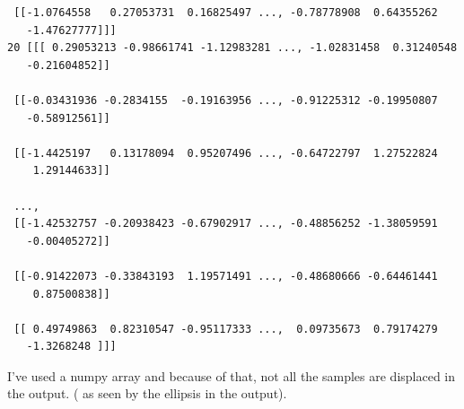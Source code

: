 \documentclass[10pt]{article}
\begin{document}
\begin{flushleft}
\begin{lstlisting}
 [[-1.0764558   0.27053731  0.16825497 ..., -0.78778908  0.64355262
   -1.47627777]]]
20 [[[ 0.29053213 -0.98661741 -1.12983281 ..., -1.02831458  0.31240548
   -0.21604852]]

 [[-0.03431936 -0.2834155  -0.19163956 ..., -0.91225312 -0.19950807
   -0.58912561]]

 [[-1.4425197   0.13178094  0.95207496 ..., -0.64722797  1.27522824
    1.29144633]]

 ..., 
 [[-1.42532757 -0.20938423 -0.67902917 ..., -0.48856252 -1.38059591
   -0.00405272]]

 [[-0.91422073 -0.33843193  1.19571491 ..., -0.48680666 -0.64461441
    0.87500838]]

 [[ 0.49749863  0.82310547 -0.95117333 ...,  0.09735673  0.79174279
   -1.3268248 ]]]
 \end{lstlisting}
 I've used a numpy array and because of that, not all the samples are displaced in the output. ( as seen by the ellipsis in the output).
\end{flushleft}
\end{document}
